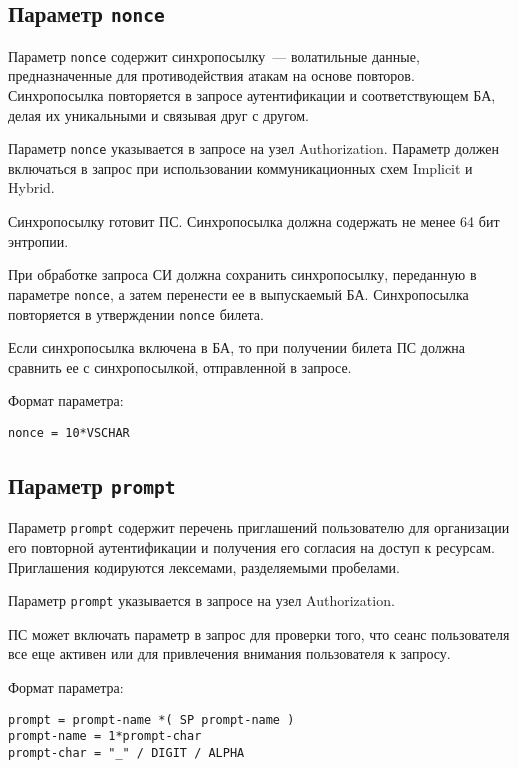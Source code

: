 \subsection{Параметр \lstinline{nonce}}\label{PARAMS.Nonce} 

Параметр \lstinline{nonce} содержит синхропосылку~--- 
волатильные данные, предназначенные для противодействия атакам на основе 
повторов. Синхропосылка повторяется в запросе аутентификации и соответствующем 
БА, делая их уникальными и связывая друг с другом. 

Параметр \lstinline{nonce} указывается в запросе на узел Authorization.
%
Параметр должен включаться в запрос при использовании коммуникационных 
схем Implicit и Hybrid.

Синхропосылку готовит ПС. Синхропосылка должна содержать не менее 64 бит 
энтропии.

При обработке запроса СИ должна сохранить синхропосылку, переданную в параметре
\lstinline{nonce}, а затем перенести ее в выпускаемый БА. Синхропосылка 
повторяется в утверждении \lstinline{nonce} билета.

Если синхропосылка включена в БА, то при получении билета ПС должна сравнить ее 
с синхропосылкой, отправленной в запросе.

Формат параметра:
\begin{lstlisting}
nonce = 10*VSCHAR
\end{lstlisting}

\subsection{Параметр \lstinline{prompt}}\label{PARAMS.Prompt}

Параметр \lstinline{prompt} содержит перечень приглашений пользователю для
организации его повторной аутентификации и получения его согласия на доступ к
ресурсам. Приглашения кодируются лексемами, разделяемыми пробелами.

Параметр \lstinline{prompt} указывается в запросе на узел Authorization.

ПС может включать параметр в запрос для проверки того, что сеанс пользователя 
все еще активен или для привлечения внимания пользователя к запросу.


Формат параметра:
\begin{lstlisting}
prompt = prompt-name *( SP prompt-name )
prompt-name = 1*prompt-char
prompt-char = "_" / DIGIT / ALPHA
\end{lstlisting}

